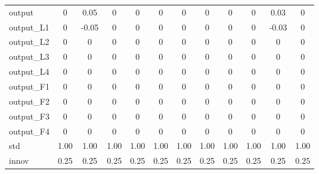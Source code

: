 \begin{tabular}{l|ccccccccc|cc}
\hline 
output & 0 & 0.05 & 0 & 0 & 0 & 0 & 0 & 0 & 0 & 0.03 & 0 \\ 
output\_L1 & 0 & -0.05 & 0 & 0 & 0 & 0 & 0 & 0 & 0 & -0.03 & 0 \\ 
output\_L2 & 0 & 0 & 0 & 0 & 0 & 0 & 0 & 0 & 0 & 0 & 0 \\ 
output\_L3 & 0 & 0 & 0 & 0 & 0 & 0 & 0 & 0 & 0 & 0 & 0 \\ 
output\_L4 & 0 & 0 & 0 & 0 & 0 & 0 & 0 & 0 & 0 & 0 & 0 \\ 
output\_F1 & 0 & 0 & 0 & 0 & 0 & 0 & 0 & 0 & 0 & 0 & 0 \\ 
output\_F2 & 0 & 0 & 0 & 0 & 0 & 0 & 0 & 0 & 0 & 0 & 0 \\ 
output\_F3 & 0 & 0 & 0 & 0 & 0 & 0 & 0 & 0 & 0 & 0 & 0 \\ 
output\_F4 & 0 & 0 & 0 & 0 & 0 & 0 & 0 & 0 & 0 & 0 & 0 \\ 
\hline 
std & 1.00 & 1.00 & 1.00 & 1.00 & 1.00 & 1.00 & 1.00 & 1.00 & 1.00 & 1.00 & 1.00 \\ 
innov & 0.25 & 0.25 & 0.25 & 0.25 & 0.25 & 0.25 & 0.25 & 0.25 & 0.25 & 0.25 & 0.25 \\ 
\hline 
\end{tabular}